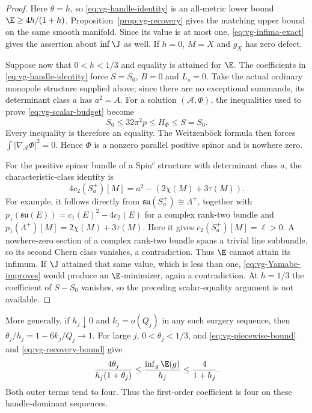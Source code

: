 \begin{proof}
Here $\theta=h$, so \eqref{eq:vg-handle-identity} is an all-metric lower
bound $\E\geq4h/(1+h)$.  Proposition~\ref{prop:vg-recovery} gives
the matching upper bound on the same smooth manifold.  Since its value
is at most one, \eqref{eq:vg-infima-exact} gives the assertion about
$\inf\J$ as well.  If $h=0$, $M=X$ and $g_X$ has zero defect.

Suppose now that $0<h<1/3$ and equality is attained for $\E$.
The coefficients in \eqref{eq:vg-handle-identity} force
$S=S_0$, $B=0$ and $L_s=0$.  Take the actual ordinary monopole
structure supplied above; since there are no exceptional summands,
its determinant class $a$ has $a^2=A$.  For a solution $(\mathcal A,\Phi)$,
the inequalities used to prove \eqref{eq:vg-scalar-budget} become
\[
 S_0\leq32\pi^2p\leq H_\Phi\leq S=S_0.
\]
Every inequality is therefore an equality.  The Weitzenb\"ock formula
then forces $\int|\nabla_{\mathcal A}\Phi|^2=0$.  Hence $\Phi$ is a
nonzero parallel positive spinor and is nowhere zero.

For the positive spinor bundle of a Spin$^c$ structure with determinant
class $a$, the characteristic-class identity is
\[
 4c_2(S_a^+)[M]=a^2-(2\chi(M)+3\tau(M)).
\]
For example, it follows directly from
$\mathfrak{su}(S_a^+)\cong\Lambda^+$, together with
$p_1(\mathfrak{su}(E))=c_1(E)^2-4c_2(E)$ for a complex rank-two bundle
and $p_1(\Lambda^+)[M]=2\chi(M)+3\tau(M)$.
Here it gives $c_2(S_a^+)[M]=\ell>0$.  A nowhere-zero section of a
complex rank-two bundle spans a trivial line subbundle, so its second
Chern class vanishes, a contradiction.  Thus $\E$ cannot attain its
infimum.  If $\J$ attained that same value, which is less than one,
\eqref{eq:vg-Yamabe-improves} would produce an $\E$-minimizer, again a
contradiction.  At $h=1/3$ the coefficient of $S-S_0$ vanishes, so the
preceding scalar-equality argument is not available.
\end{proof}

More generally, if $h_j\downarrow0$ and $k_j=o(Q_j)$ in any such surgery
sequence, then $\theta_j/h_j=1-6k_j/Q_j\to1$.
For large $j$, $0<\theta_j<1/3$, and
\eqref{eq:vg-piecewise-bound} and \eqref{eq:vg-recovery-bound} give
\begin{equation}\label{eq:vg-handle-dominant}
 \frac{4\theta_j}{h_j(1+\theta_j)}
   \leq\frac{\inf_g\E(g)}{h_j}\leq\frac4{1+h_j}.
\end{equation}
Both outer terms tend to four.  Thus the first-order coefficient is four
on these handle-dominant sequences.


